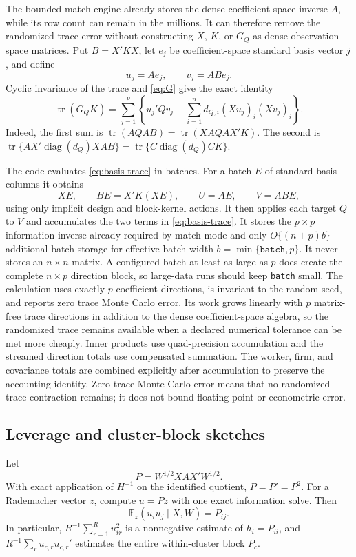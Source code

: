 \documentclass[11pt]{article}
\newcommand{\diag}{\operatorname{diag}}
\newcommand{\tr}{\operatorname{tr}}
\newcommand{\E}{\mathbb E}
\begin{document}
The bounded match engine already stores the dense coefficient-space inverse
$A$, while its row count can remain in the millions.  It can therefore remove
the randomized trace error without constructing $X$, $K$, or $G_Q$ as dense
observation-space matrices.  Put $B=X'KX$, let $e_j$ be coefficient-space
standard basis vector $j$, and define
\[
 u_j=Ae_j,\qquad v_j=ABe_j.
\]
Cyclic invariance of the trace and \eqref{eq:G} give the exact identity
\begin{equation}
 \tr(G_QK)
 =\sum_{j=1}^p\left\{
   u_j'Qv_j-
   \sum_{i=1}^n d_{Q,i}(Xu_j)_i(Xv_j)_i
 \right\}.                                             \label{eq:basis-trace}
\end{equation}
Indeed, the first sum is
$\tr(AQAB)=\tr(XAQAX'K)$.  The second is
$\tr\{AX'\diag(d_Q)XAB\}=\tr\{C\diag(d_Q)CK\}$.

The code evaluates \eqref{eq:basis-trace} in batches.  For a batch $E$ of
standard basis columns it obtains
\[
 XE,\qquad BE=X'K(XE),\qquad U=AE,\qquad V=ABE,
\]
using only implicit design and block-kernel actions.  It then applies each
target $Q$ to $V$ and accumulates the two terms in
\eqref{eq:basis-trace}.  It stores the $p\times p$ information inverse already
required by match mode and only $O\{(n+p)b\}$ additional batch storage for
effective batch width $b=\min\{\texttt{batch},p\}$.  It never stores an
$n\times n$ matrix.  A configured batch at least as large as $p$ does create
the complete $n\times p$ direction block, so large-data runs should keep
\texttt{batch} small.  The calculation uses exactly $p$ coefficient
directions, is invariant
to the random seed, and reports zero trace Monte Carlo error.  Its work grows
linearly with $p$ matrix-free trace directions in addition to the dense
coefficient-space algebra, so the randomized trace remains available when a
declared numerical tolerance can be met more cheaply.  Inner products use
quad-precision accumulation and the streamed direction totals use compensated
summation.  The worker, firm, and covariance totals are combined explicitly
after accumulation to preserve the accounting identity.  Zero trace Monte
Carlo error means that no randomized trace contraction remains; it does not
bound floating-point or econometric error.

\subsection{Leverage and cluster-block sketches}

Let
\[
 P=W^{1/2}XAX'W^{1/2}.
\]
With exact application of $H^{-1}$ on the identified quotient,
$P=P'=P^2$.  For a Rademacher vector $z$, compute $u=Pz$ with one exact
information solve.  Then
\begin{equation}
 \E_z(u_iu_j\mid X,W)=P_{ij}.                            \label{eq:Psketch}
\end{equation}
In particular, $R^{-1}\sum_{r=1}^Ru_{ir}^2$ is a nonnegative estimate of
$h_i=P_{ii}$, and
$R^{-1}\sum_ru_{c,r}u_{c,r}'$ estimates the entire within-cluster block
$P_c$.
\end{document}
